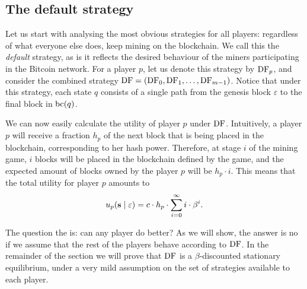  \subsection{The default strategy}

Let us start with analysing the most obvious strategies for all players: regardless of what everyone else does, keep mining on the blockchain. We call this 
the \emph{default} strategy, as is it reflects the desired behaviour of the miners participating in the Bitcoin network. 
For a player $p$, let us denote this strategy 
by $\text{\rm DF}_p$, and consider the combined strategy $\text{\rm DF} = (\text{\rm DF}_0,\text{\rm DF}_1,\dots,\text{\rm DF}_{m-1})$. Notice that under this strategy, each state $q$ consists of a single path from the genesis block $\varepsilon$ to the final block in $\text{bc}(q)$.

We can now easily calculate the utility of player $p$ under $\text{\rm DF}$. Intuitively, a player $p$ will receive a fraction $h_p$ of the next block that is being placed in the blockchain, corresponding to her hash power. Therefore, at stage $i$ of the mining game, $i$ blocks will be placed in the blockchain defined by the game, and the expected amount of blocks owned by the player $p$ will be $h_p\cdot i$. This means that the total utility for player $p$ amounts to 
$$u_p(\mathbf{s} \mid \varepsilon) = c\cdot h_p \cdot \sum_{i=0}^{\infty}i \cdot \beta^{i}.$$


The question the is: can any player do better? As we will show, the answer is no if we assume that the rest of the players behave according to $\text{\rm DF}$. In the remainder of the section we 
will prove that $\text{\rm DF}$ is a $\beta$-discounted stationary equilibrium, under a very mild assumption on the set of strategies available to each player. 


